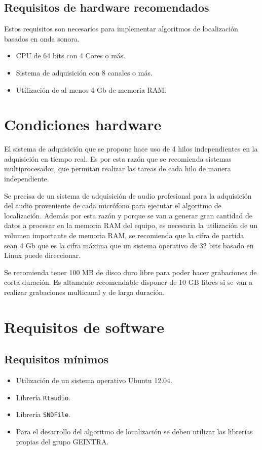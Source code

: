 \subsection{Requisitos de hardware recomendados}
Estos requisitos son necesarios para implementar algoritmos de localización basados en onda sonora.
\begin{itemize}
  \item CPU de 64 bits con 4 Cores o más.
  \item Sistema de adquisición con 8 canales o más.
  \item Utilización de al menos 4 Gb de memoria RAM.
\end{itemize}

\section{Condiciones hardware}

El sistema de adquisición que se propone hace uso de 4 hilos independientes en la adquisición en tiempo real. Es por esta razón que se recomienda sistemas multiprocesador, que permitan realizar las tareas de cada hilo de manera independiente.

Se precisa de un sistema de adquisición de audio profesional para la adquisición del audio proveniente de cada micrófono para ejecutar el algoritmo de localización. Además por esta razón y porque se van a generar gran cantidad de datos a procesar en la memoria RAM del equipo, es necesaria la utilización de un volumen importante de memoria RAM, se recomienda que la cifra de partida sean 4 Gb que es la cifra máxima que un sistema operativo de 32 bits basado en Linux puede direccionar.

Se recomienda tener 100 MB de disco duro libre para poder hacer grabaciones de corta duración. Es altamente recomendable disponer de 10 GB libres si se van a realizar grabaciones multicanal y de larga duración.
 
\section{Requisitos de software}

\subsection{Requisitos mínimos}
\begin{itemize}
  \item Utilización de un sistema operativo Ubuntu 12.04.
  \item Librería \texttt{Rtaudio}.
  \item Librería \texttt{SNDFile}.
  \item Para el desarrollo del algoritmo de localización se deben utilizar las librerías propias del grupo GEINTRA.
\end{itemize}

